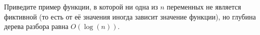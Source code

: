 Приведите пример функции, в которой ни одна из $n$ переменных не является фиктивной (то есть от её значения иногда зависит
значение функции), но глубина дерева разбора равна $O(\log(n))$.